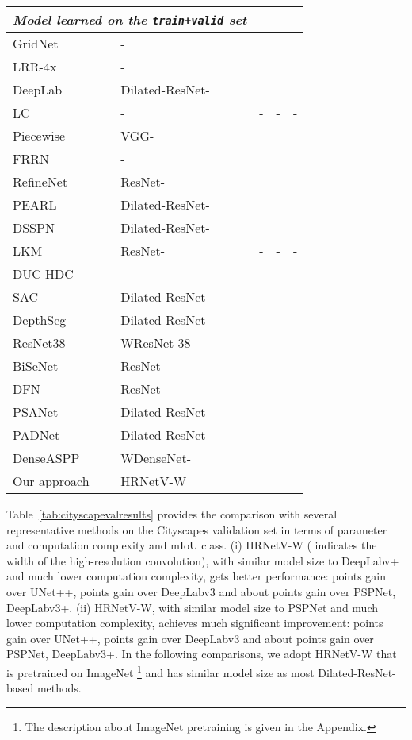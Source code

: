 \documentclass[10pt,twocolumn,letterpaper]{article}
\begin{document}
\begin{table}[t]
\begin{tabular}{l|l|cccc}
			\hline
			\multicolumn{3}{l}{
			\emph {Model learned on the \texttt{train+valid} set}}\\
			\hline
			GridNet~\cite{FourureEFMT017} & - &  &  &  & \\
			LRR-4x~\cite{GhiasiF16} & - &  &  &  & \\
			DeepLab~\cite{ChenPKMY18} & Dilated-ResNet- &  &  &  & \\
			LC~\cite{LiLLLT17}& - &  & - & - & - \\
			Piecewise~\cite{LinSHR16}& VGG- &  &  &  & \\
			FRRN~\cite{PohlenHML17}& - &  &  &  & \\
			RefineNet~\cite{LinMSR17}& ResNet- &  &  &  & \\
			PEARL~\cite{JinLXSLYCDLJFY17} & Dilated-ResNet- &  &  &  &  \\
			DSSPN~\cite{LiangZX18} & Dilated-ResNet- &  &  &  & \\
			LKM~\cite{PengZYLS17}& ResNet- &  & - & - & - \\
			DUC-HDC~\cite{WangCYLHHC18}& - &  &  &  & \\
			SAC~\cite{ZhangTZLY17} & Dilated-ResNet- &  & - & - & - \\
			DepthSeg~\cite{KongF18} & Dilated-ResNet- & & - & - & - \\
			ResNet38~\cite{WuSH16e} & WResNet-38 & & & & \\
			BiSeNet~\cite{YuWPGYS182} & ResNet- &  & - & - & - \\
			DFN~\cite{YuWPGYS18} & ResNet- &  & - & - & - \\
			PSANet~\cite{ZhaoZLSLLJ18} & Dilated-ResNet- &  & - & - & - \\
			PADNet~\cite{OWS18} & Dilated-ResNet- &  &  &  & \\
			DenseASPP~\cite{ZhaoSQWJ17} & WDenseNet- &  &  &  &  \\
			\hline
			Our approach &  HRNetV-W  &  &  &  &  \\
			\hline
		\end{tabular}
		\vspace{-3mm}
	\end{table}

Table~\ref{tab:cityscapevalresults} provides the comparison with several representative methods
on the Cityscapes validation set
in terms of parameter and computation complexity and mIoU class.
(i) HRNetV-W ( indicates the width of the high-resolution convolution), with similar model size to DeepLabv+
and much lower computation complexity, gets better performance:
 points gain over UNet++,  points gain over DeepLabv3
and about  points gain over PSPNet, DeepLabv3+.
(ii) HRNetV-W, with similar model size to PSPNet and much lower computation complexity, achieves much significant improvement:
 points gain over UNet++,  points gain over DeepLabv3
and about  points gain over PSPNet, DeepLabv3+.
In the following comparisons,
we adopt HRNetV-W that is pretrained on ImageNet
\footnote{The
description about
ImageNet pretraining
is given in the Appendix.}
and has similar model size
as most Dilated-ResNet- based methods.
\end{document}
